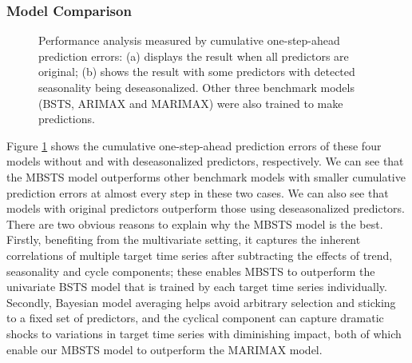 \documentclass[twoside,11pt]{article}
\begin{document}
\subsubsection{Model Comparison}
\begin{figure}[h]
	\caption{Performance analysis measured by cumulative one-step-ahead prediction errors: (a) displays the result when all predictors are original; (b) shows the result with some predictors with detected seasonality being deseasonalized. 
		Other three benchmark models (BSTS, ARIMAX and MARIMAX) were also trained to make predictions.}
	\label{fig:forecascompare}
\end{figure}


Figure \ref{fig:forecascompare} shows the cumulative one-step-ahead prediction errors of these four models without and with deseasonalized predictors, respectively. We can see that the MBSTS model outperforms other benchmark models with
smaller cumulative prediction errors at almost every step in these two cases. We can also see that models with original predictors outperform those using deseasonalized predictors. There are two obvious reasons to explain why the MBSTS model is the best.
Firstly, benefiting from the multivariate setting, it captures the inherent correlations of multiple target time series after subtracting the effects of trend, seasonality and cycle components; these enables MBSTS to outperform the univariate BSTS model that is trained by each target time series individually. Secondly, 
Bayesian model averaging helps avoid arbitrary selection and sticking to a fixed set of predictors, and the cyclical component can capture dramatic shocks to variations in target time series with diminishing impact, both of which enable our MBSTS model to outperform the MARIMAX model.
\end{document}

